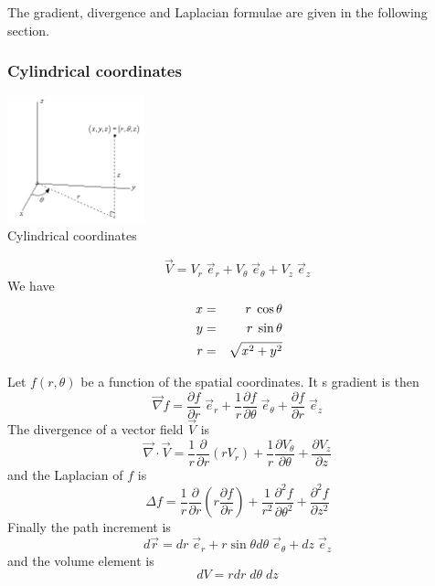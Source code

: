 The gradient, divergence and Laplacian formulae are given in the following section.


\subsubsection{Cylindrical coordinates \label{ss:cylcoord}}

\begin{center}
\includegraphics[width=4cm]{images/cylindrical}\\
{\captionfont Cylindrical coordinates}
\end{center}

\[
{\vec V} 
= V_r \; \vec{e}_r  + V_\theta \; \vec{e}_\theta + V_z \; \vec{e}_z
\]
We have 
\begin{eqnarray}
x &=& r \; \cos\theta \nn\\
y &=& r \; \sin \theta \nn\\\ 
r &=& \sqrt{x^2+y^2} \nn
\end{eqnarray}

Let $f(r,\theta)$ be a function of the spatial coordinates. It s gradient is then
\[
\vec \nabla f
= \frac{\partial f}{\partial r} \; \vec{e}_r 
+ \frac{1}{r} \frac{\partial f}{\partial \theta} \; \vec{e}_\theta
+ \frac{\partial f}{\partial r} \; \vec{e}_z
\]
The divergence of a vector field $\vec{V}$ is 
\[
\vec\nabla \cdot \vec{V} 
= \frac{1}{r} \frac{\partial }{\partial r} (r V_r) 
+ \frac{1}{r} \frac{\partial V_\theta}{\partial \theta} 
+ \frac{\partial V_z}{\partial z}
\]
and the Laplacian of $f$ is
\[
\Delta f = \frac{1}{r} \frac{\partial }{\partial r} \left( r \frac{\partial f}{\partial r} \right)
+ \frac{1}{r^2} \frac{\partial^2 f}{\partial \theta^2} 
+ \frac{\partial^2 f}{\partial z^2} 
\]
Finally the path increment is
\[
d\vec{r} = dr \; {\vec e}_r  + r \sin\theta d\theta \; {\vec e}_\theta + dz \; \vec{e}_z
\]
and the volume element is 
\[
dV= r dr \; d\theta \; dz
\]

